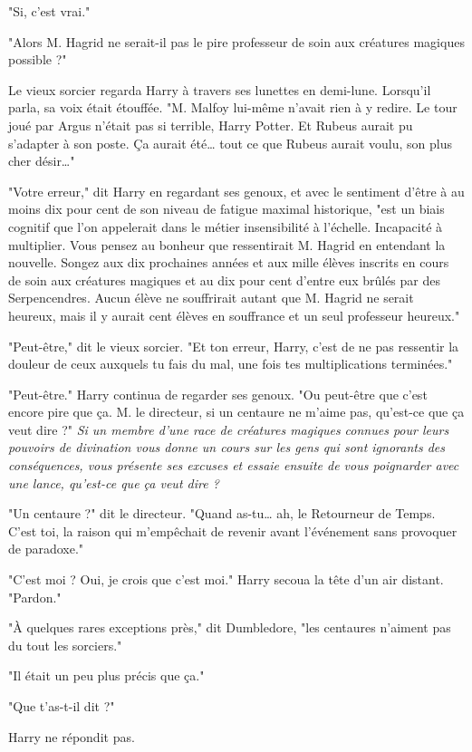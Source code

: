 "Si, c'est vrai."

"Alors M. Hagrid ne serait-il pas le pire professeur de soin aux créatures magiques possible ?"

Le vieux sorcier regarda Harry à travers ses lunettes en demi-lune. Lorsqu'il parla, sa voix était étouffée. "M. Malfoy lui-même n'avait rien à y redire. Le tour joué par Argus n'était pas si terrible, Harry Potter. Et Rubeus aurait pu s'adapter à son poste. Ça aurait été… tout ce que Rubeus aurait voulu, son plus cher désir…"

"Votre erreur," dit Harry en regardant ses genoux, et avec le sentiment d'être à au moins dix pour cent de son niveau de fatigue maximal historique, "est un biais cognitif que l'on appelerait dans le métier insensibilité à l'échelle. Incapacité à multiplier. Vous pensez au bonheur que ressentirait M. Hagrid en entendant la nouvelle. Songez aux dix prochaines années et aux mille élèves inscrits en cours de soin aux créatures magiques et au dix pour cent d'entre eux brûlés par des Serpencendres. Aucun élève ne souffrirait autant que M. Hagrid ne serait heureux, mais il y aurait cent élèves en souffrance et un seul professeur heureux."

"Peut-être," dit le vieux sorcier. "Et ton erreur, Harry, c'est de ne pas ressentir la douleur de ceux auxquels tu fais du mal, une fois tes multiplications terminées."

"Peut-être." Harry continua de regarder ses genoux. "Ou peut-être que c'est encore pire que ça. M. le directeur, si un centaure ne m'aime pas, qu'est-ce que ça veut dire ?" \emph{Si un membre d'une race de créatures magiques connues pour leurs pouvoirs de divination vous donne un cours sur les gens qui sont ignorants des conséquences, vous présente ses excuses et essaie ensuite de vous poignarder avec une lance, qu'est-ce que ça veut dire ?} 

"Un centaure ?" dit le directeur. "Quand as-tu… ah, le Retourneur de Temps. C'est toi, la raison qui m'empêchait de revenir avant l'événement sans provoquer de paradoxe."

"C'est moi ? Oui, je crois que c'est moi." Harry secoua la tête d'un air distant. "Pardon."

"À quelques rares exceptions près," dit Dumbledore, "les centaures n'aiment pas du tout les sorciers."

"Il était un peu plus précis que ça."

"Que t'as-t-il dit ?"

Harry ne répondit pas.

